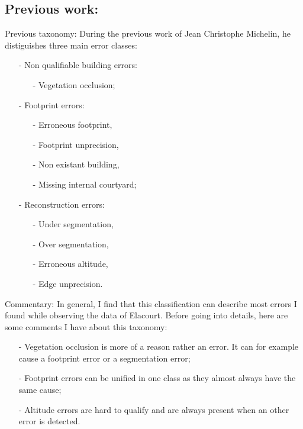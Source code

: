 \documentclass[9pt]{beamer}
\begin{document}
	\subsection[Previous]{Previous work:}
	\begin{frame}{Previous taxonomy:}
		During the previous work of Jean Christophe Michelin, he distiguishes three main error classes:
		\begin{itemize}
			\item[-] Non qualifiable building errors:
			\begin{itemize}
				\item[-] Vegetation occlusion;
			\end{itemize}
			\item[-] Footprint errors:
			\begin{itemize}
				\item[-] Erroneous footprint,
				\item[-] Footprint unprecision,
				\item[-] Non existant building,
				\item[-] Missing internal courtyard;
			\end{itemize}
			\item[-] Reconstruction errors:
			\begin{itemize}
				\item[-] Under segmentation,
				\item[-] Over segmentation,
				\item[-] Erroneous altitude,
				\item[-] Edge unprecision.
			\end{itemize}
		\end{itemize}
	\end{frame}
	
	\begin{frame}{Commentary:}
		In general, I find that this classification can describe most errors I found while observing the data of Elacourt. Before going into details, here are some comments I have about this taxonomy:
		\begin{itemize}
			\item[-] Vegetation occlusion is more of a reason rather an error. It can for example cause a footprint error or a segmentation error;
			\item[-] Footprint errors can be unified in one class as they almost always have the same cause;
			\item[-] Altitude errors are hard to qualify and are always present when an other error is detected.
		\end{itemize}
	\end{frame}
\end{document}
